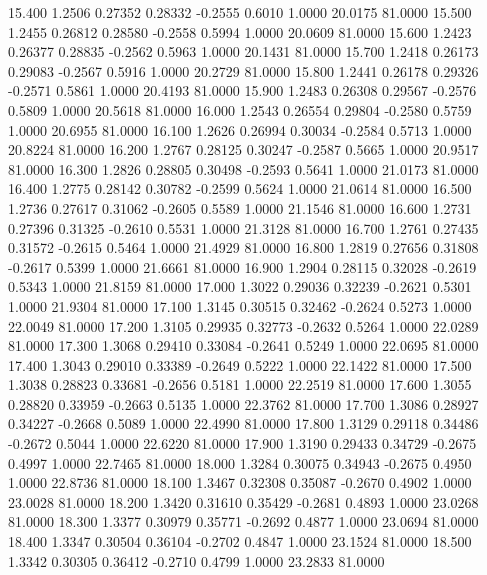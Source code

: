   15.400   1.2506   0.27352   0.28332  -0.2555   0.6010   1.0000  20.0175  81.0000
  15.500   1.2455   0.26812   0.28580  -0.2558   0.5994   1.0000  20.0609  81.0000
  15.600   1.2423   0.26377   0.28835  -0.2562   0.5963   1.0000  20.1431  81.0000
  15.700   1.2418   0.26173   0.29083  -0.2567   0.5916   1.0000  20.2729  81.0000
  15.800   1.2441   0.26178   0.29326  -0.2571   0.5861   1.0000  20.4193  81.0000
  15.900   1.2483   0.26308   0.29567  -0.2576   0.5809   1.0000  20.5618  81.0000
  16.000   1.2543   0.26554   0.29804  -0.2580   0.5759   1.0000  20.6955  81.0000
  16.100   1.2626   0.26994   0.30034  -0.2584   0.5713   1.0000  20.8224  81.0000
  16.200   1.2767   0.28125   0.30247  -0.2587   0.5665   1.0000  20.9517  81.0000
  16.300   1.2826   0.28805   0.30498  -0.2593   0.5641   1.0000  21.0173  81.0000
  16.400   1.2775   0.28142   0.30782  -0.2599   0.5624   1.0000  21.0614  81.0000
  16.500   1.2736   0.27617   0.31062  -0.2605   0.5589   1.0000  21.1546  81.0000
  16.600   1.2731   0.27396   0.31325  -0.2610   0.5531   1.0000  21.3128  81.0000
  16.700   1.2761   0.27435   0.31572  -0.2615   0.5464   1.0000  21.4929  81.0000
  16.800   1.2819   0.27656   0.31808  -0.2617   0.5399   1.0000  21.6661  81.0000
  16.900   1.2904   0.28115   0.32028  -0.2619   0.5343   1.0000  21.8159  81.0000
  17.000   1.3022   0.29036   0.32239  -0.2621   0.5301   1.0000  21.9304  81.0000
  17.100   1.3145   0.30515   0.32462  -0.2624   0.5273   1.0000  22.0049  81.0000
  17.200   1.3105   0.29935   0.32773  -0.2632   0.5264   1.0000  22.0289  81.0000
  17.300   1.3068   0.29410   0.33084  -0.2641   0.5249   1.0000  22.0695  81.0000
  17.400   1.3043   0.29010   0.33389  -0.2649   0.5222   1.0000  22.1422  81.0000
  17.500   1.3038   0.28823   0.33681  -0.2656   0.5181   1.0000  22.2519  81.0000
  17.600   1.3055   0.28820   0.33959  -0.2663   0.5135   1.0000  22.3762  81.0000
  17.700   1.3086   0.28927   0.34227  -0.2668   0.5089   1.0000  22.4990  81.0000
  17.800   1.3129   0.29118   0.34486  -0.2672   0.5044   1.0000  22.6220  81.0000
  17.900   1.3190   0.29433   0.34729  -0.2675   0.4997   1.0000  22.7465  81.0000
  18.000   1.3284   0.30075   0.34943  -0.2675   0.4950   1.0000  22.8736  81.0000
  18.100   1.3467   0.32308   0.35087  -0.2670   0.4902   1.0000  23.0028  81.0000
  18.200   1.3420   0.31610   0.35429  -0.2681   0.4893   1.0000  23.0268  81.0000
  18.300   1.3377   0.30979   0.35771  -0.2692   0.4877   1.0000  23.0694  81.0000
  18.400   1.3347   0.30504   0.36104  -0.2702   0.4847   1.0000  23.1524  81.0000
  18.500   1.3342   0.30305   0.36412  -0.2710   0.4799   1.0000  23.2833  81.0000
